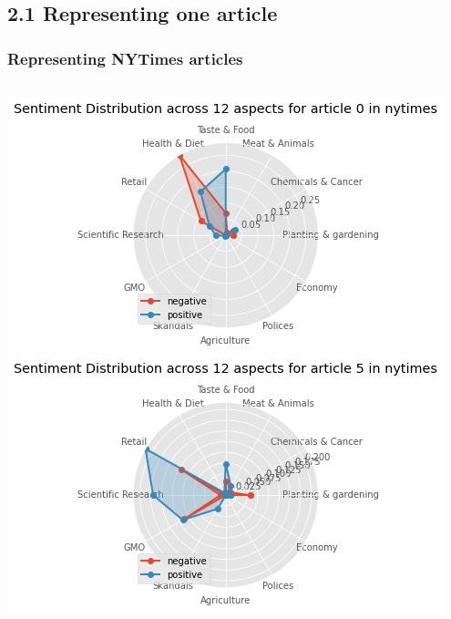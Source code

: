\documentclass{tum-presentation}
\begin{document}
\subsection{2.1 Representing one article}
\begin{frame}
  \frametitle{Representing NYTimes articles}
  \begin{columns}[t]
    \centering
    \includegraphics[width = \textwidth]{figures/radar_nytimes_0.png}\\
    \centering
    \includegraphics[width = \textwidth]{figures/radar_nytimes_5.png}
    \end{columns}
    
\end{frame}
\end{document}
